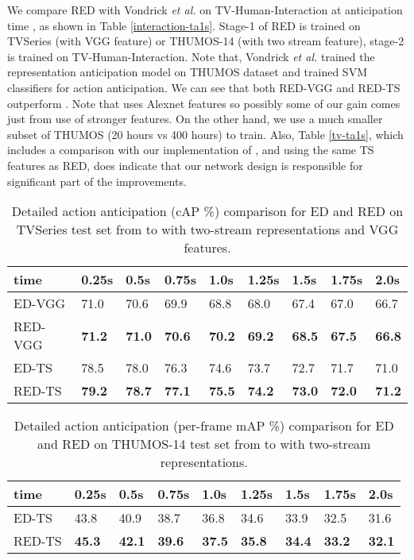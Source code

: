 \documentclass{bmvc2k}
\begin{document}
We compare RED with Vondrick \emph{et al.} \cite{vondrick2016anticipating} on TV-Human-Interaction at anticipation time , as shown in Table \ref{interaction-ta1s}. Stage-1 of RED is trained on TVSeries (with VGG feature) or THUMOS-14 (with two stream feature), stage-2 is trained on TV-Human-Interaction. Note that, Vondrick \emph{et al.} \cite{vondrick2016anticipating} trained the representation anticipation model on THUMOS dataset and trained SVM classifiers for action anticipation. We can see that both RED-VGG and RED-TS outperform \cite{vondrick2016anticipating}. Note that \cite{vondrick2016anticipating} uses Alexnet features so possibly some of our gain comes just from use of stronger features. On the other hand, we use a much smaller subset of THUMOS (20 hours vs 400 hours) to train. Also, Table \ref{tv-ta1s}, which includes a comparison with our implementation of \cite{vondrick2016anticipating},  and using the same TS features as RED,  does indicate that our network design is responsible for significant part of the improvements. 


\begin{table}[h]
\centering
\caption{Detailed action anticipation (cAP \%) comparison for ED and RED on TVSeries test set from  to  with two-stream representations and VGG features.}
\label{tv-ed-red}
\begin{tabular}{l|llllllll}
\hline
time &0.25s & 0.5s & 0.75s & 1.0s & 1.25s & 1.5s & 1.75s & 2.0s \\ \hline
ED-VGG   &  71.0 & 70.6 & 69.9 & 68.8    & 68.0     & 67.4   &     67.0 &  66.7   \\ 
RED-VGG     & \textbf{71.2} &  \textbf{71.0}   &\textbf{70.6}  & \textbf{70.2}&  \textbf{69.2}    &    \textbf{68.5} & \textbf{67.5}     &  \textbf{66.8}  \\ \hline

ED-TS   &  78.5 & 78.0 & 76.3     & 74.6    & 73.7     & 72.7   &     71.7 &  71.0   \\ 
RED-TS   & \textbf{79.2} &  \textbf{78.7}   &\textbf{77.1}  & \textbf{75.5}&  \textbf{74.2}    &    \textbf{73.0} & \textbf{72.0}     &  \textbf{71.2}  \\ \hline
\end{tabular}
\end{table}

\begin{table}[h]
\centering
\caption{Detailed action anticipation (per-frame mAP \%) comparison for ED and RED on THUMOS-14 test set from  to  with two-stream representations.}
\label{thumos-ed-red}
\begin{tabular}{l|llllllll}
\hline
time  &0.25s & 0.5s & 0.75s & 1.0s & 1.25s & 1.5s & 1.75s & 2.0s \\ \hline

ED-TS     & 43.8  & 40.9 &   38.7   &   36.8  &  34.6  & 33.9  & 32.5 & 31.6   \\ 
RED-TS    & \textbf{45.3} &  \textbf{42.1}   &\textbf{39.6}  & \textbf{37.5}&  \textbf{35.8}    &    \textbf{34.4} & \textbf{33.2}     &  \textbf{32.1}  \\ \hline
\end{tabular}
\end{table}
\end{document}
